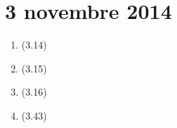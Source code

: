 \section{3 novembre 2014}

\begin{enumerate}
    \item (3.14)
    \item (3.15)
    \item (3.16)
    \item (3.43)
\end{enumerate}